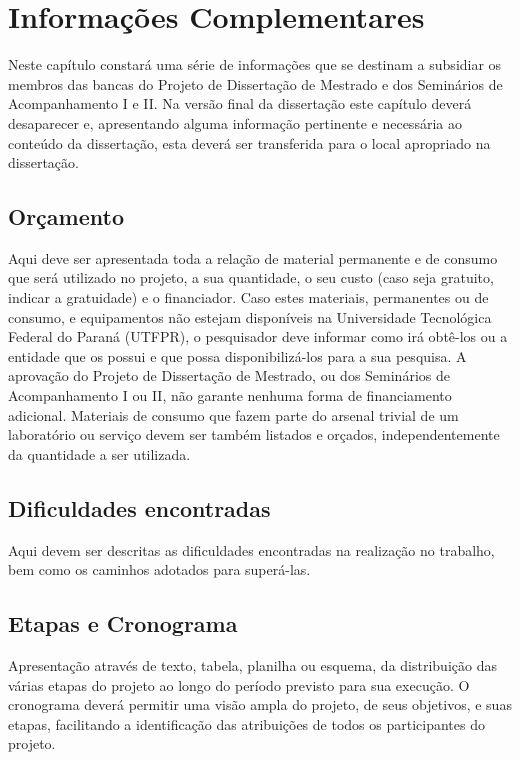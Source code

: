 \chapter{Informa\c{c}\~oes Complementares}
\label{chap:infcompl}

Neste capítulo constará uma série de informações que se destinam a subsidiar os membros das bancas do Projeto de Dissertação de Mestrado e dos Seminários de Acompanhamento I e II. 
Na versão final da dissertação este capítulo deverá desaparecer e, apresentando alguma informação pertinente e necessária ao conteúdo da dissertação, esta deverá ser transferida para o local apropriado na dissertação.

\section{Or\c{c}amento}
Aqui deve ser apresentada toda a relação de material permanente e de consumo que será utilizado no projeto, a sua quantidade, o seu custo (caso seja gratuito, indicar a gratuidade) e o financiador. Caso estes materiais, permanentes ou de consumo, e equipamentos não estejam disponíveis na Universidade Tecnológica Federal do Paraná (UTFPR), o pesquisador deve informar como irá obtê-los ou a entidade que os possui e que possa disponibilizá-los para a sua pesquisa. A aprovação do Projeto de Dissertação de Mestrado, ou dos Seminários de Acompanhamento I ou II, não garante nenhuma forma de financiamento adicional.
Materiais de consumo que fazem parte do arsenal trivial de um laboratório ou serviço devem ser também listados e orçados, independentemente da quantidade a ser utilizada.

\section{Dificuldades encontradas}
Aqui devem ser descritas as dificuldades encontradas na realização no trabalho, bem como os caminhos adotados para superá-las.

\section{Etapas e Cronograma}
Apresentação através de texto, tabela, planilha ou esquema, da distribuição das várias etapas do projeto ao longo do período previsto para sua execução. O cronograma deverá permitir uma visão ampla do projeto, de seus objetivos, e suas etapas, facilitando a identificação das atribuições de todos os participantes do projeto.

